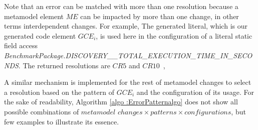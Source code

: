 Note that an error can be matched with more than one resolution because a metamodel element $ME$ can be impacted by more than one change, in other terms interdependent changes. 
For example,  The generated literal, which is our generated code element $GCE_i$, is used here in the configuration of a literal static field access 
\emph{\footnotesize{BenchmarkPackage.DISCOVERY\_\_TOTAL\_EXECUTION\_TIME\_IN\_SECONDS}}. The returned resolutions are $CR5$ and $CR10$~{\small{}}, %




A similar mechanism is implemented for the rest of metamodel changes to select a resolution based on the pattern of $GCE_i$ and the configuration of its usage. %
For the sake of readability, Algorithm \ref{algo :ErrorPatternalgo} does not show all possible combinations of $metamodel$ $changes \times patterns \times configurations$, but few examples to illustrate its essence. 

